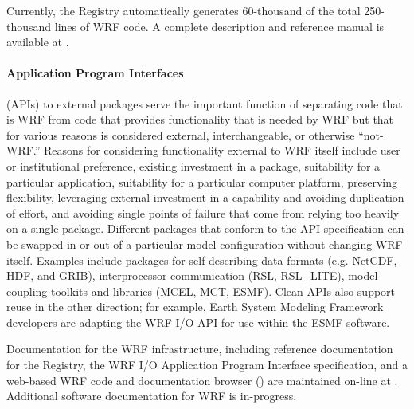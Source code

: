 Currently, the Registry automatically
generates 60-thousand of the total 250-thousand lines of WRF code.
A complete description and reference manual is available at \citep{sasi}.

\paragraph{Application Program Interfaces} 
(APIs) to external packages serve the important function of separating
code that is WRF from code that provides functionality that is needed
by WRF but that for various reasons is considered external,
interchangeable, or otherwise ``not-WRF.'' Reasons for considering
functionality external to WRF itself include user or institutional
preference, existing investment in a package, suitability for a
particular application, suitability for a particular computer platform,
preserving flexibility, leveraging external investment in a capability
and avoiding duplication of effort, and avoiding single points of
failure that come from relying too heavily on a single package.
Different packages that conform to the API specification can be swapped
in or out of a particular model configuration without changing WRF
itself.  Examples include packages for self-describing data formats
(e.g. NetCDF, HDF, and GRIB), interprocessor communication (RSL,
RSL\_LITE), model coupling toolkits and libraries (MCEL, MCT, ESMF).
Clean APIs also support reuse in the other direction; for example,
Earth System Modeling Framework developers are adapting the WRF I/O API
for use within the ESMF software.

Documentation for the WRF infrastructure, including reference
documentation for the Registry, the WRF I/O Application Program
Interface specification, and a web-based WRF code and documentation
browser (\citet{fiedler}) are maintained on-line at \citep{sasi}.
Additional software documentation for WRF is in-progress.


